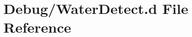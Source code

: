 \hypertarget{_water_detect_8d}{}\section{Debug/\+Water\+Detect.d File Reference}
\label{_water_detect_8d}

